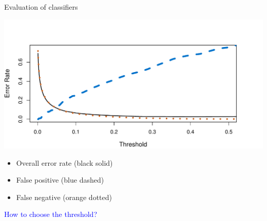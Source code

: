 \documentclass[14pt]{beamer}
\begin{document}
\begin{frame}{Evaluation of classifiers}


\centerline{\includegraphics[width=.8\textwidth]{4-7}}

\begin{itemize}
	\item Overall error rate (black solid) 
	\item False positive (blue dashed)
	\item False negative (orange dotted)
\end{itemize}

\centerline{\textcolor{blue}{How to choose the threshold?}}


\end{frame}
\end{document}
